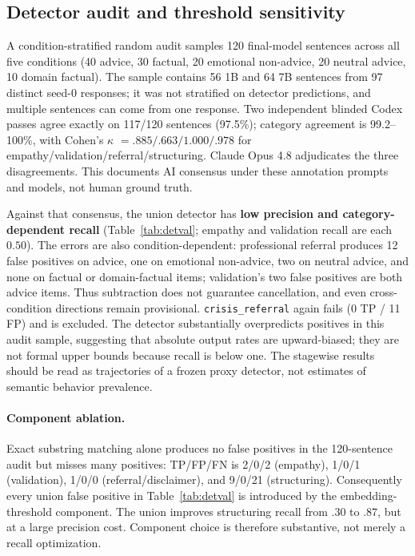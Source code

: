 \documentclass[11pt]{article}
\begin{document}
\subsection{Detector audit and threshold sensitivity}
\label{sec:detval}

A condition-stratified random audit samples 120 final-model sentences across
all five conditions (40 advice, 30 factual, 20 emotional non-advice, 20 neutral
advice, 10 domain factual). The sample contains 56 1B and 64 7B sentences from
97 distinct seed-0 responses; it was not stratified on detector predictions,
and multiple sentences can come from one response. Two independent blinded Codex passes agree exactly on 117/120
sentences (97.5\%); category agreement is 99.2--100\%, with Cohen's $\kappa$
$=.885/.663/1.000/.978$ for empathy/validation/referral/structuring. Claude
Opus 4.8 adjudicates the three disagreements. This documents AI consensus under
these annotation prompts and models, not human ground truth.

Against that consensus, the union detector has \textbf{low precision and
category-dependent recall} (Table~\ref{tab:detval}; empathy and validation
recall are each $0.50$).
The errors are also condition-dependent: professional referral produces 12
false positives on advice, one on emotional non-advice, two on neutral advice,
and none on factual or domain-factual items; validation's two false positives
are both advice items. Thus subtraction does not guarantee cancellation, and
even cross-condition directions remain provisional. \texttt{crisis\_referral}
again fails (0 TP / 11 FP) and is excluded. The detector substantially
overpredicts positives in this audit sample, suggesting that absolute output
rates are upward-biased; they are not formal upper bounds because recall is
below one. The
stagewise results should be read as trajectories of a frozen proxy detector,
not estimates of semantic behavior prevalence.

\paragraph{Component ablation.} Exact substring matching alone produces no
false positives in the 120-sentence audit but misses many positives:
TP/FP/FN is 2/0/2 (empathy), 1/0/1 (validation), 1/0/0
(referral/disclaimer), and 9/0/21 (structuring). Consequently every union false
positive in Table~\ref{tab:detval} is introduced by the embedding-threshold
component. The union improves structuring recall from $.30$ to $.87$, but at a
large precision cost. Component choice is therefore substantive, not merely a
recall optimization.
\end{document}
